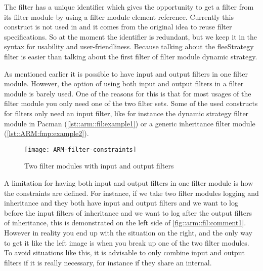 The filter has a unique identifier which gives the opportunity to get a filter from its filter module by
using a filter module element reference. Currently this construct is not used in \Compose* and it comes from the original idea to reuse filter specifications.
So at the moment the identifier is redundant, but we keep it in the syntax for usability and user-friendliness. Because talking about the fleeStrategy filter is easier
than talking about the first filter of filter module dynamic strategy.

As mentioned earlier it is possible to have input and output filters in one filter module. However, the option of using both input and output filters in a filter module is barely used.
One of the reasons for this is that for most usages of the filter module you only need one of the two filter sets. Some of the used constructs for filters only need an input filter, like for instance the dynamic strategy filter module in Pacman (\autoref{lst::arm::fil:example1}) or a generic inheritance filter module (\autoref{lst::ARM:fmp:example2}).

\begin{figure}[tpb]
	\centering
	\texttt{[image: ARM-filter-constraints]}
	\caption{Two filter modules with input and output filters}
	\label{fig::arm::fil:comment1}
\end{figure}

A limitation for having both input and output filters in one filter module is how the constraints are defined. For instance, if we take two filter modules logging and inheritance and they both have input and output filters and we want to log before the input filters of inheritance and we want to log after the output filters of inheritance, this is demonstrated on the left side of \autoref{fig::arm::fil:comment1}. However in reality
you end up with the situation on the right, and the only way to get it like the left image is when you break up one of the two filter modules.
To avoid situations like this, it is advisable to only combine input and output filters if it is really necessary, for instance if they share an internal.

